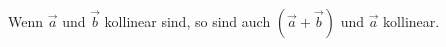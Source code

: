 
Wenn $\overrightarrow{a}$ und $\overrightarrow{b}$ kollinear sind, so sind auch $\left(\overrightarrow{a}+\overrightarrow{b}\right)$ und $\overrightarrow{a}$ kollinear.
